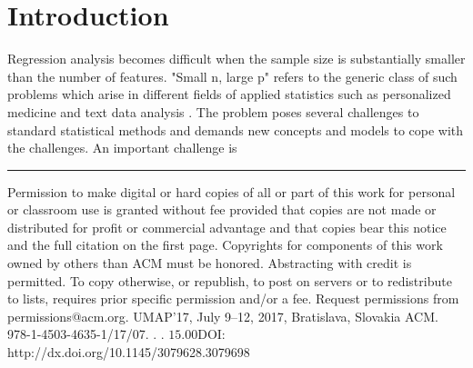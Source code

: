\documentclass{sig-alternate}
\begin{document}
\section{Introduction}
Regression analysis becomes difficult when the sample size is substantially
smaller than the number of features. "Small n, large p"
refers to the generic class of such problems which arise in different
fields of applied statistics such as personalized medicine \cite{2569992285,I28oKV} and
text data analysis \cite{Forman:2003:EES:944919.944974,Qu:2010:BMR:1873781.1873884}. The problem poses several challenges
to standard statistical methods \cite{Johnstone558612} and demands new concepts
and models to cope with the challenges. An important challenge is

\hrule

{\scriptsize Permission to make digital or hard copies of all or part of this work for personal or
classroom use is granted without fee provided that copies are not made or distributed
for profit or commercial advantage and that copies bear this notice and the full citation
on the first page. Copyrights for components of this work owned by others than ACM
must be honored. Abstracting with credit is permitted. To copy otherwise, or republish,
to post on servers or to redistribute to lists, requires prior specific permission and/or a
fee. Request permissions from permissions@acm.org.
UMAP'17, July 9–12, 2017, Bratislava, Slovakia
 ACM. 978-1-4503-4635-1/17/07. . . $15.00
$DOI: http://dx.doi.org/10.1145/3079628.3079698}
\end{document}
